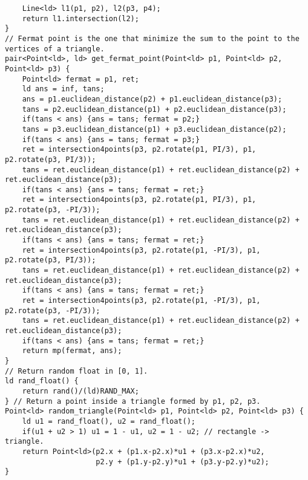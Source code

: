 \documentclass[a4paper]{article}
\begin{document}
\begin{verbatim}
    Line<ld> l1(p1, p2), l2(p3, p4);
    return l1.intersection(l2);
}
// Fermat point is the one that minimize the sum to the point to the vertices of a triangle.
pair<Point<ld>, ld> get_fermat_point(Point<ld> p1, Point<ld> p2, Point<ld> p3) {
    Point<ld> fermat = p1, ret;
    ld ans = inf, tans;
    ans = p1.euclidean_distance(p2) + p1.euclidean_distance(p3);
    tans = p2.euclidean_distance(p1) + p2.euclidean_distance(p3);
    if(tans < ans) {ans = tans; fermat = p2;}
    tans = p3.euclidean_distance(p1) + p3.euclidean_distance(p2);
    if(tans < ans) {ans = tans; fermat = p3;}
    ret = intersection4points(p3, p2.rotate(p1, PI/3), p1, p2.rotate(p3, PI/3));
    tans = ret.euclidean_distance(p1) + ret.euclidean_distance(p2) + ret.euclidean_distance(p3);
    if(tans < ans) {ans = tans; fermat = ret;}
    ret = intersection4points(p3, p2.rotate(p1, PI/3), p1, p2.rotate(p3, -PI/3));
    tans = ret.euclidean_distance(p1) + ret.euclidean_distance(p2) + ret.euclidean_distance(p3);
    if(tans < ans) {ans = tans; fermat = ret;}
    ret = intersection4points(p3, p2.rotate(p1, -PI/3), p1, p2.rotate(p3, PI/3));
    tans = ret.euclidean_distance(p1) + ret.euclidean_distance(p2) + ret.euclidean_distance(p3);
    if(tans < ans) {ans = tans; fermat = ret;}
    ret = intersection4points(p3, p2.rotate(p1, -PI/3), p1, p2.rotate(p3, -PI/3));
    tans = ret.euclidean_distance(p1) + ret.euclidean_distance(p2) + ret.euclidean_distance(p3);
    if(tans < ans) {ans = tans; fermat = ret;}
    return mp(fermat, ans);
}
// Return random float in [0, 1].
ld rand_float() {
    return rand()/(ld)RAND_MAX;
} // Return a point inside a triangle formed by p1, p2, p3.
Point<ld> random_triangle(Point<ld> p1, Point<ld> p2, Point<ld> p3) {
    ld u1 = rand_float(), u2 = rand_float();
    if(u1 + u2 > 1) u1 = 1 - u1, u2 = 1 - u2; // rectangle -> triangle.
    return Point<ld>(p2.x + (p1.x-p2.x)*u1 + (p3.x-p2.x)*u2,
                     p2.y + (p1.y-p2.y)*u1 + (p3.y-p2.y)*u2);
}
\end{verbatim}
\end{document}

